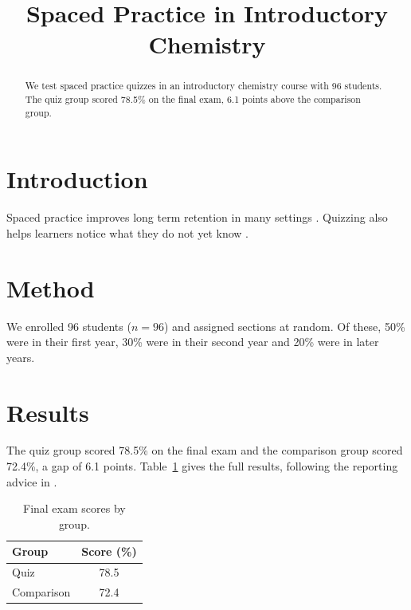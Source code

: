 \documentclass{article}
\begin{document}
\title{Spaced Practice in Introductory Chemistry}
\maketitle

\begin{abstract}
We test spaced practice quizzes in an introductory chemistry course with 96 students.
The quiz group scored 78.5\% on the final exam, 6.1 points above the comparison group.
\end{abstract}

\section{Introduction}
Spaced practice improves long term retention in many settings \citep{cepeda2006}.
Quizzing also helps learners notice what they do not yet know \citet{roediger2006}.

\section{Method}
We enrolled 96 students ($n = 96$) and assigned sections at random.
Of these, 50\% were in their first year, 30\% were in their second year and 20\% were in later years.

\section{Results}
The quiz group scored 78.5\% on the final exam and the comparison group scored 72.4\%, a gap of 6.1 points.
Table~\ref{tab:main} gives the full results, following the reporting advice in \cite{dunlosky2013}.

\begin{table}[t]
\caption{Final exam scores by group.}
\label{tab:main}
\begin{tabular}{lc}
\toprule
Group & Score (\%) \\
\midrule
Quiz & 78.5 \\
Comparison & 72.4 \\
\bottomrule
\end{tabular}
\end{table}



\end{document}
